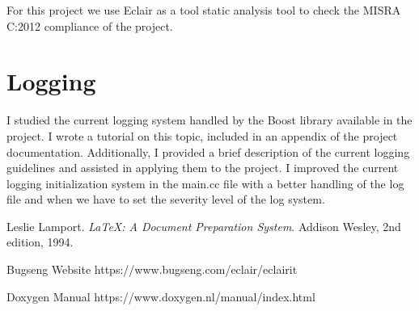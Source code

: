 \documentclass[a4paper, 12pt]{article}
\begin{document}
For this project we use Eclair \cite{Eclair} as a tool static analysis tool to check the MISRA C:2012 compliance of the project.

\section{Logging}

I studied the current logging system handled by the Boost library available in the project. 
I wrote a tutorial on this topic, included in an appendix of the project documentation. Additionally, I provided a brief description of the current logging guidelines and assisted in applying them to the project.
I improved the current logging initialization system in the main.cc file with a better handling of the log file and when we have to set the 
severity level of the log system.


\begin{thebibliography}{9}
    Leslie Lamport.
    \textit{LaTeX: A Document Preparation System}.
    Addison Wesley, 2nd edition, 1994.

    Bugseng Website
    https://www.bugseng.com/eclair/eclairit

    Doxygen Manual
    https://www.doxygen.nl/manual/index.html

\end{thebibliography}
\end{document}
